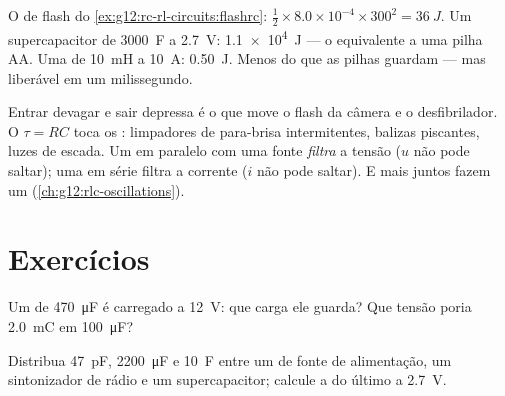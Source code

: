 \begin{example}\label{ex:g12:rc-rl-circuits:energies}
O  de flash do \cref{ex:g12:rc-rl-circuits:flashrc}:
$\tfrac12 \times 8.0\times10^{-4} \times 300^2 = \qty{36}{J}$. Um supercapacitor de
\qty{3000}{F} a \qty{2.7}{V}: \qty{1.1e4}{J} --- o equivalente a uma pilha AA. Uma
 de \qty{10}{mH} a \qty{10}{A}: \qty{0.50}{J}. Menos do que as pilhas guardam ---
mas liberável em um milissegundo.
\end{example}

\begin{remark}\label{rem:g12:rc-rl-circuits:applications}
Entrar devagar e sair depressa é o que move o flash da câmera e o desfibrilador. O
 $\tau = RC$ toca os : limpadores de para-brisa
intermitentes, balizas piscantes, luzes de escada. Um  em paralelo com uma
fonte \emph{filtra} a tensão ($u$ não pode saltar); uma  em série filtra a
corrente ($i$ não pode saltar). E  mais  juntos fazem um 
(\cref{ch:g12:rlc-oscillations}).
\end{remark}

\section{Exercícios}

\begin{exercise}[$\star$]\label{exo:g12:rc-rl-circuits:1}
Um  de \qty{470}{\micro F} é carregado a \qty{12}{V}: que carga ele guarda? Que
tensão poria \qty{2.0}{mC} em \qty{100}{\micro F}?
\end{exercise}

\begin{exercise}[$\star$]\label{exo:g12:rc-rl-circuits:2}
Distribua \qty{47}{pF}, \qty{2200}{\micro F} e \qty{10}{F} entre um  de fonte de
alimentação, um sintonizador de rádio e um supercapacitor; calcule a  do último
a \qty{2.7}{V}.
\end{exercise}

